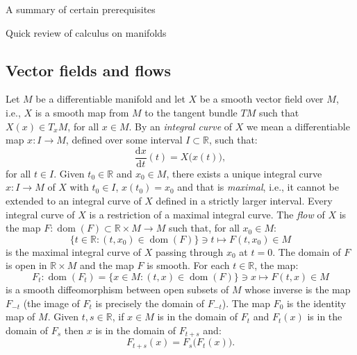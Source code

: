 \documentclass[oneside,a4paper,11pt]{amsbook}
\newcommand{\R}{\mathds R}
\newcommand{\dd}{\mathrm d}
\DeclareMathOperator{\Dom}{dom}
\theoremstyle{remark}\newtheorem{exercise}{Exercise}[chapter]
\theoremstyle{plain}\newtheorem{teo}{Theorem}[section]
\theoremstyle{plain}\newtheorem{lem}[teo]{Lemma}
\theoremstyle{plain}\newtheorem{prop}[teo]{Proposition}
\theoremstyle{plain}\newtheorem{cor}[teo]{Corollary}
\theoremstyle{definition}\newtheorem{defin}[teo]{Definition}
\theoremstyle{remark}\newtheorem{rem}[teo]{Remark}
\theoremstyle{definition}\newtheorem{notation}[teo]{Notation}
\theoremstyle{definition}\newtheorem{convention}[teo]{Convention}
\theoremstyle{definition}\newtheorem{example}[teo]{Example}
\numberwithin{section}{chapter}
\numberwithin{equation}{section}
\begin{document}
\begin{chapter}{A summary of certain prerequisites}
\begin{section}{Quick review of calculus on manifolds}
\subsection{Vector fields and flows} Let $M$ be a differentiable manifold and let $X$ be a smooth
vector field over $M$, i.e., $X$ is a smooth map from $M$ to the tangent bundle $TM$
such that $X(x)\in T_xM$, for all $x\in M$. By an {\em integral curve\/} of $X$ we mean a differentiable map
$x:I\to M$, defined over some interval $I\subset\R$, such that:
\[\frac{\dd x}{\dd t}(t)=X\big(x(t)\big),\]
for all $t\in I$. Given $t_0\in\R$ and $x_0\in M$, there exists a unique integral curve $x:I\to M$ of $X$
with $t_0\in I$, $x(t_0)=x_0$ and that is {\em maximal}, i.e., it cannot be extended to an integral curve of $X$
defined in a strictly larger interval. Every integral curve of $X$ is a restriction of a maximal integral curve.
The {\em flow\/} of $X$ is the map $F:\Dom(F)\subset\R\times M\to M$
such that, for all $x_0\in M$:
\[\big\{t\in\R:(t,x_0)\in\Dom(F)\big\}\ni t\longmapsto F(t,x_0)\in M\]
is the maximal integral curve of $X$ passing through $x_0$ at $t=0$. The domain of $F$ is open in $\R\times M$ and the map
$F$ is smooth. For each $t\in\R$, the map:
\[F_t:\Dom(F_t)=\big\{x\in M:(t,x)\in\Dom(F)\big\}\ni x\longmapsto F(t,x)\in M\]
is a smooth diffeomorphism between open subsets of $M$ whose inverse is the map $F_{-t}$ (the image of $F_t$
is precisely the domain of $F_{-t}$). The map $F_0$ is the identity map of $M$.
Given $t,s\in\R$, if $x\in M$ is in the domain of $F_t$ and $F_t(x)$ is in the domain of $F_s$ then $x$ is in the domain of $F_{t+s}$ and:
\[F_{t+s}(x)=F_s\big(F_t(x)\big).\]


\end{section}
\end{chapter}
\end{document}
